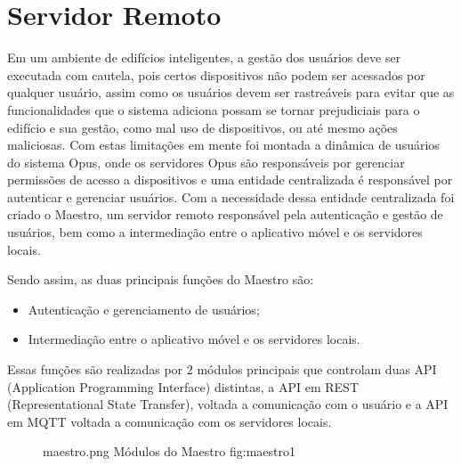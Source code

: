 \section{\textbf{Servidor Remoto}}
\label{chap:maestro}
Em um ambiente de edifícios inteligentes, a gestão dos usuários deve ser executada com cautela, pois certos dispositivos não podem
ser acessados por qualquer usuário, assim como os usuários devem ser rastreáveis para evitar que as funcionalidades que o sistema adiciona
possam se tornar prejudiciais para o edifício e sua gestão, como mal uso de dispositivos, ou até mesmo ações maliciosas. Com estas limitações
em mente foi montada a dinâmica de usuários do sistema Opus, onde os servidores Opus são responsáveis por gerenciar permissões
de acesso a dispositivos e uma entidade centralizada é responsável por autenticar e gerenciar usuários. Com a necessidade dessa entidade centralizada
foi criado o Maestro, um servidor remoto responsável pela autenticação e gestão de usuários, bem como a intermediação entre o aplicativo móvel e 
os servidores locais.

Sendo assim, as duas principais funções do Maestro são:
\begin{itemize}
    \item Autenticação e gerenciamento de usuários;
    \item Intermediação entre o aplicativo móvel e os servidores locais.
\end{itemize}
Essas funções são realizadas por 2 módulos principais que controlam duas API (Application Programming Interface) distintas, a API em 
REST (Representational State Transfer), voltada a comunicação com o usuário e a API em MQTT voltada a comunicação com os servidores locais.

\begin{figure}[h!]
    {maestro.png}
    {Módulos do Maestro}
    {fig:maestro1}
\end{figure}



